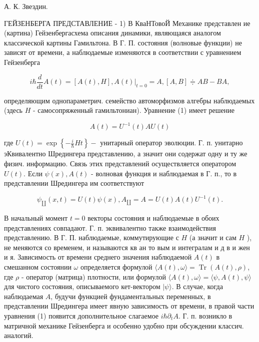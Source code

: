 \documentclass[10pt]{article}
\begin{document}
А. К. Звездин.



ГЕЙЗЕНБЕРГА ПРЕДСТАВЛЕНИЕ - 1) В КваНТовоЙ Механике представлен ие (картина) Гейзенбергасхема описания динамики, являющаяся аналогом классической картины Гамильтона. В Г. П. состояния (волновые функции) не зависят от времени, а наблюдаемые изменяются в соответствии с уравнением Гейзенберга



\[

i \hbar \frac{d}{d t} A(t)=[A(t), H],\left.A(t)\right|_{t=0}=A,[A, B] \doteqdot A B-B A,

\]



определяющим однопараметрич. семейство автоморфизмов алгебры наблюдаемых (здесь $H$ - самосопряженный гамильтониан). Уравнение (1) имеет решение



\[

A(t)=U^{-1}(t) A U(t)

\]



где $U(t)=\exp \left\{-\frac{i}{\hbar} H t\right\}-$ унитарный оператор эволюции. Г. п. унитарно эКвивалентно Шредингера представлению, а значит они содержат одну и ту же физич. информацию. Связь этих представлений осуществляется оператором $U(t)$. Если $\psi(x), A(t)$ - волновая функция и наблюдаемая в Г. п., то в представлении Шредингера им соответствуют



\[

\psi_{\amalg}(x, t)=U(t) \psi(x), A_{\amalg}=A=U(t) A(t) U^{-1}(t) .

\]



В начальный момент $t=0$ векторы состояния и наблюдаемые в обоих представлениях совпадают. Г. п. эквивалентно также взаимодействия представлению. В Г. П. наблюдаемые, коммутирующие с $H$ (а значит и сам $H$ ), не меняются со временем, и называются кв ан то вым и интегралам и д в и жен и я. Зависимость от времени среднего значения наблюдаемой $A(t)$ в смешанном состоянии $\omega$ определяется формулой $\langle A(t), \omega\rangle=\operatorname{Tr}(A(t), \rho)$, где $\rho$ - оператор (матрица) плотности, или формулой $\langle A(t), \omega\rangle=\langle\psi, A(t), \psi\rangle$ для чистого состояния, описываемого кет-вектором $|\psi\rangle$. В случае, когда наблюдаемая $A$, будучи функцией фундаментальных переменных, в представлении Шредингера имеет явную зависимость от времени, в правой части уравнения (1) появится дополнительное слагаемое $i \hbar \partial_{t} A$. Г. п. возникло в матричной механике Гейзенберга и особенно удобно при обсуждении классич. аналогий.
\end{document}
